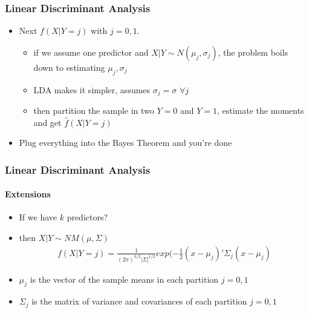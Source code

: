 \documentclass[
  shownotes,
  xcolor={svgnames},
  hyperref={colorlinks,citecolor=DarkBlue,linkcolor=andesred,urlcolor=DarkBlue}
  , aspectratio=169]{beamer}
\begin{document}
\begin{frame}[fragile]
\frametitle{Linear Discriminant Analysis}


\begin{itemize}
    \item Next $f(X|Y=j)$ with $j=0,1$. 
    \medskip
    \begin{itemize}
    \item if we assume one predictor and $X|Y\sim N(\mu_j,\sigma_j)$, the problem boils down to estimating $\mu_j,\sigma_j$
    \medskip
    \item LDA makes it simpler, assumes $\sigma_j=\sigma$ $\forall j$
    \medskip
    \item then partition the sample in two $Y=0$ and $Y=1$, estimate the moments and get $\hat{f}(X|Y=j)$
    \medskip
    \end{itemize}
    \item Plug everything into the Bayes Theorem and you're done
    
\end{itemize}


\end{frame}
\begin{frame}[fragile]
\frametitle{Linear Discriminant Analysis}
\framesubtitle{Extensions}

\begin{itemize}
    \item If we have $k$ predictors?
    \medskip
    \item then $X|Y \sim NM(\mu,\Sigma)$
    \begin{align}
    f(X|Y=j) = \frac{1}{(2\pi)^{k/2}|\Sigma|^{1/2}}exp(-\frac{1}{2}(x-\mu_j)'\Sigma_j(x-\mu_j)
    \end{align}
    \item $\mu_j$ is the vector of the sample means in each partition $j=0,1$
    \medskip
    \item $\Sigma_j$ is the matrix of variance and covariances of each partition $j=0,1$
    
    \end{itemize}
\end{frame}
\end{document}

